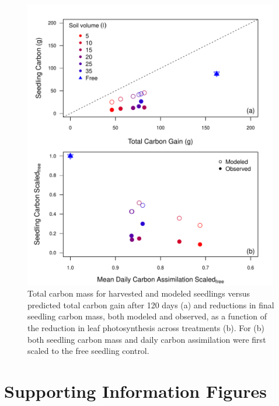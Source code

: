 \documentclass[a4paper]{article}\usepackage[]{graphicx}\usepackage[]{color}
\begin{document}
\begin{figure}[h!]
    \centering
    \includegraphics[width=0.99\textwidth]{massmodel_totalC.pdf}
    \caption{Total carbon mass for harvested and modeled seedlings versus predicted total carbon gain after 120 days (a) and  reductions in final seedling carbon mass, both modeled and observed, as a function of the reduction in leaf photosynthesis across treatments (b). For (b) both seedling carbon mass and daily carbon assimilation were first scaled to the free seedling control.}
    \label{fig:figure6}
\end{figure}

\clearpage
\section{Supporting Information Figures}

\renewcommand\thefigure{S\arabic{figure}}    
\setcounter{figure}{0}   
\end{document}
